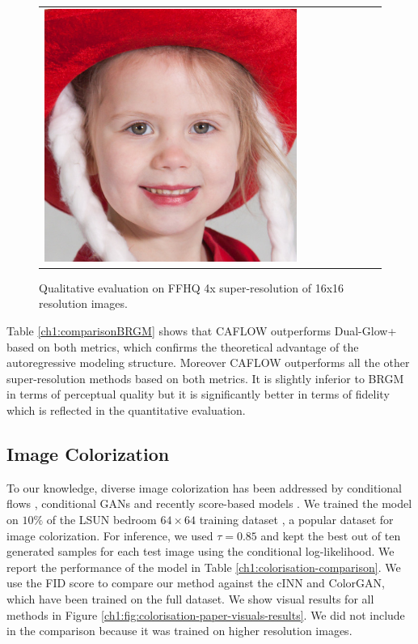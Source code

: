 \begin{figure}[h!]
\begin{center}
\begin{tabular}{cccccccc}
        \includegraphics[width=0.12\linewidth]{Chapter1/paper_graphs/super_resolution/TRUE.jpg} \\
    \end{tabular}
    \end{center}
    \caption{Qualitative evaluation on FFHQ 4x super-resolution of 16x16 resolution images.}\label{ch1:SR-visuals-paper}
    \end{figure}
    
    Table \ref{ch1:comparisonBRGM} shows that CAFLOW outperforms Dual-Glow+ based on both metrics, which confirms the theoretical advantage of the autoregressive modeling structure. Moreover CAFLOW outperforms all the other super-resolution methods based on both metrics. It is slightly inferior to BRGM \cite{BRGM} in terms of perceptual quality but it is significantly better in terms of fidelity which is reflected in the quantitative evaluation.


\subsection{Image Colorization}
    To our knowledge, diverse image colorization has been addressed by conditional flows \cite{ardizzone2019guided}, conditional GANs \cite{colorGAN} and recently score-based models \cite{scorebased}. 
    We trained the model on $10\%$ of the LSUN bedroom $64\times 64$ training dataset \cite{yu2015lsun},  a popular dataset for image colorization. For inference, we used $\tau=0.85$ and kept the best out of ten generated samples for each test image using the conditional log-likelihood. We report the performance of the model in Table \ref{ch1:colorisation-comparison}. We use the FID score to compare our method against the cINN and ColorGAN, which have been trained on the full dataset. We show visual results for all methods in Figure \ref{ch1:fig:colorisation-paper-visuals-results}. 
    We did not include \cite{scorebased} in the comparison because it was trained on higher resolution images.

